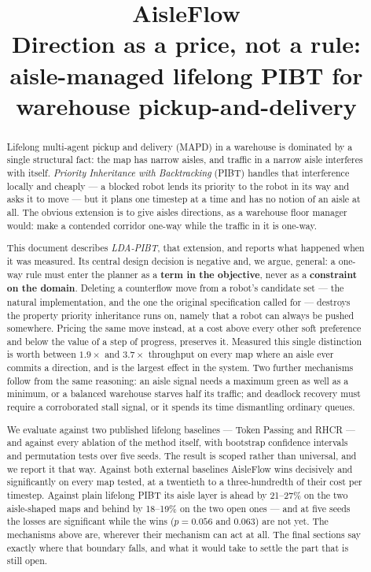 \documentclass[11pt,a4paper]{article}
\title{\textbf{AisleFlow}\\[0.35em]
  \large Direction as a price, not a rule:\\
  aisle-managed lifelong PIBT for warehouse pickup-and-delivery}
\author{}
\date{}
\begin{document}
\maketitle
\thispagestyle{empty}

\begin{abstract}
\noindent
Lifelong multi-agent pickup and delivery (MAPD) in a warehouse is dominated by
a single structural fact: the map has narrow aisles, and traffic in a narrow
aisle interferes with itself. \emph{Priority Inheritance with Backtracking}
(PIBT) handles that interference locally and cheaply --- a blocked robot lends
its priority to the robot in its way and asks it to move --- but it plans one
timestep at a time and has no notion of an aisle at all. The obvious extension
is to give aisles directions, as a warehouse floor manager would: make a
contended corridor one-way while the traffic in it is one-way.

This document describes \emph{LDA-PIBT}, that extension, and reports what
happened when it was measured. Its central design decision is negative and, we
argue, general: a one-way rule must enter the planner as a \textbf{term in the
objective}, never as a \textbf{constraint on the domain}. Deleting a
counterflow move from a robot's candidate set --- the natural implementation,
and the one the original specification called for --- destroys the property
priority inheritance runs on, namely that a robot can always be pushed
somewhere. Pricing the same move instead, at a cost above every other soft
preference and below the value of a step of progress, preserves it. Measured
this single distinction is worth between $1.9\times$ and $3.7\times$
throughput on every map where an aisle ever commits a direction, and is the
largest effect in the system. Two further
mechanisms follow from the same reasoning: an aisle signal needs a maximum
green as well as a minimum, or a balanced warehouse starves half its traffic;
and deadlock recovery must require a corroborated stall signal, or it spends
its time dismantling ordinary queues.

We evaluate against two published lifelong baselines --- Token Passing and
RHCR --- and against every ablation of the method itself, with bootstrap
confidence intervals and permutation tests over five seeds. The result is
scoped rather than universal, and we report it that way. Against both external
baselines AisleFlow wins decisively and significantly on every map tested, at a
twentieth to a three-hundredth of their cost per timestep. Against plain
lifelong PIBT its aisle layer is ahead by 21--27\% on the two aisle-shaped maps
and behind by 18--19\% on the two open ones --- and at five seeds the losses
are significant while the wins ($p = 0.056$ and $0.063$) are not yet. The
mechanisms above are, wherever their mechanism can act at all. The final
sections say exactly where that boundary falls, and what it would take to
settle the part that is still open.
\end{abstract}
\end{document}
